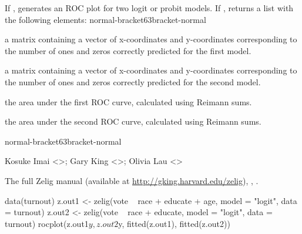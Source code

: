 \begin{Value}
If ,  generates an ROC plot for
two logit or probit models.  If , 
returns a list with the following elements: normal-bracket63bracket-normal
\begin{ldescription}
\item[\code{roc1}] a matrix containing a vector of x-coordinates and
y-coordinates corresponding to the number of ones and zeros correctly
predicted for the first model.
\item[\code{roc2}] a matrix containing a vector of x-coordinates and
y-coordinates corresponding to the number of ones and zeros correctly
predicted for the second model.
\item[\code{area1}] the area under the first ROC curve, calculated using
Reimann sums.
\item[\code{area2}] the area under the second ROC curve, calculated using
Reimann sums.
\end{ldescription}

normal-bracket63bracket-normal
\end{Value}
\begin{Author}\relax
Kosuke Imai <>; Gary King
<>; Olivia Lau <>
\end{Author}
\begin{SeeAlso}\relax
The full Zelig manual (available at
\url{http://gking.harvard.edu/zelig}), , .
\end{SeeAlso}
\begin{Examples}
\begin{ExampleCode}
data(turnout)
z.out1 <- zelig(vote ~ race + educate + age, model = "logit", 
  data = turnout)
z.out2 <- zelig(vote ~ race + educate, model = "logit", 
  data = turnout)
rocplot(z.out1$y, z.out2$y, fitted(z.out1), fitted(z.out2))
\end{ExampleCode}
\end{Examples}



